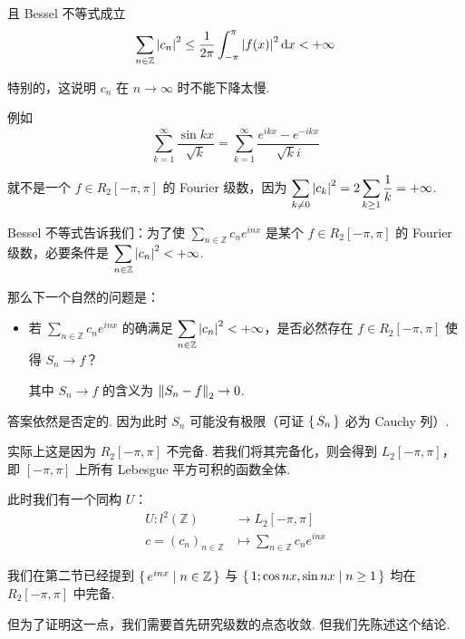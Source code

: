 且 Bessel 不等式成立
$$
\sum_{n\in\mathbb{Z}}\left\lvert{c_n}\right\rvert^2\le\frac{1}{2\pi}\int_{-\pi}^{\pi}\left\lvert{f(x)}\right\rvert^2\mathrm{d} x<+\infty
$$

特别的，这说明 $c_n$ 在 $n\to\infty$ 时不能下降太慢.

例如
$$
\displaystyle\sum_{k=1}^\infty\frac{\sin kx}{\sqrt{k}}=\sum_{k=1}^\infty\frac{e^{ikx}-e^{-ikx}}{\sqrt{k}i}
$$

就不是一个 $f\in R_2[-\pi,\pi]$ 的 Fourier 级数，因为 $\displaystyle\sum_{k\ne 0}\left\lvert{c_k}\right\rvert^2=2\sum_{k\ge 1}\frac{1}{k}=+\infty$.

Bessel 不等式告诉我们：为了使 $\displaystyle\sum_{n\in\mathbb{Z}}c_ne^{inx}$ 是某个 $f\in R_2[-\pi,\pi]$ 的 Fourier 级数，必要条件是 $\displaystyle\sum_{n\in\mathbb{Z}}\left\lvert{c_n}\right\rvert^2<+\infty$.

那么下一个自然的问题是：

\begin{itemize}
    \item 若 $\displaystyle\sum_{n\in\mathbb{Z}}c_ne^{inx}$ 的确满足 $\displaystyle\sum_{n\in\mathbb{Z}}\left\lvert{c_n}\right\rvert^2<+\infty$，是否必然存在 $f\in R_2[-\pi,\pi]$ 使得 $S_n\to f$？
    
    其中 $S_n\to f$ 的含义为 $\left\lVert{S_n-f}\right\rVert_2\to 0$.
\end{itemize}

答案依然是否定的. 因为此时 $S_n$ 可能没有极限（可证 $\set{S_n}$ 必为 Cauchy 列）.

实际上这是因为 $R_2[-\pi,\pi]$ 不完备. 若我们将其完备化，则会得到 $L_2[-\pi,\pi]$，即 $[-\pi,\pi]$ 上所有 Lebesgue 平方可积的函数全体.

此时我们有一个同构 $U$：
$$
\begin{aligned}
    U:l^2(\mathbb{Z})&\to L_2[-\pi,\pi]\\
    c=(c_n)_{n\in\mathbb{Z}}&\mapsto\sum_{n\in\mathbb{Z}}c_ne^{inx}
\end{aligned}
$$


我们在第二节已经提到 $\set{e^{inx}|n\in\mathbb{Z}}$ 与 $\set{1;\cos nx,\sin nx|n\ge 1}$ 均在 $R_2[-\pi,\pi]$ 中完备.

但为了证明这一点，我们需要首先研究级数的点态收敛. 但我们先陈述这个结论.

